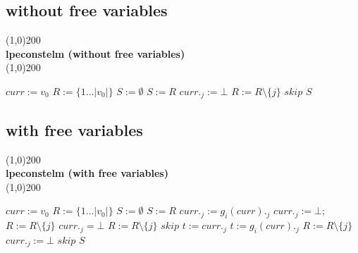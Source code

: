 \index{}\documentclass[a4paper,10pt]{article}
\theoremstyle{plain}
\theoremstyle{definition}
\begin{document}
\subsection{without free variables} \label{sec:alg}
\line(1,0){200}\\
\textbf{lpeconstelm (without free variables)}\\
\line(1,0){200}
\begin{algorithmic}[1]
\STATE $curr := v_0$
\STATE $R := \lbrace 1 \ldots \vert v_0 \vert \rbrace $
\STATE $S := \emptyset $
    \STATE $S := R$
              \STATE $curr._j := \bot$
              \STATE $R := R \setminus \lbrace j \rbrace$
              \STATE $skip$
          \ENDIF 
        \ENDFOR
    \ENDFOR 
  \ENDWHILE
\RETURN $S$
\end{algorithmic}

\newpage
\subsection{with free variables}
\line(1,0){200}\\
\textbf{lpeconstelm (with free variables)}\\
\line(1,0){200}
\begin{algorithmic}[1]
\STATE $curr := v_0$
\STATE $R := \lbrace 1 \ldots \vert v_0 \vert \rbrace $
\STATE $S := \emptyset $
    \STATE $S := R$
              \STATE $ curr._j := g_i(curr)._j $
              \STATE $ curr._j := \bot $; 
              \STATE $R:= R \setminus \lbrace j \rbrace $
            \ENDIF
              \STATE $curr._j = \bot$
              \STATE $R := R \setminus \lbrace j \rbrace$
              \STATE $skip$
            \ENDIF
          \ENDIF 
        \ENDFOR
    \ENDFOR 
  \ENDWHILE \newline
    \STATE $t := curr._j$
        \STATE $ t := g_i(curr)._j $
        \STATE $ R := R \setminus \lbrace j \rbrace$
        \STATE $ curr._j := \bot $
        \STATE $skip$
      \ENDIF
    \ENDFOR
  \ENDFOR
\ENDWHILE
\RETURN $S$
\end{algorithmic}
\newpage
\end{document}

